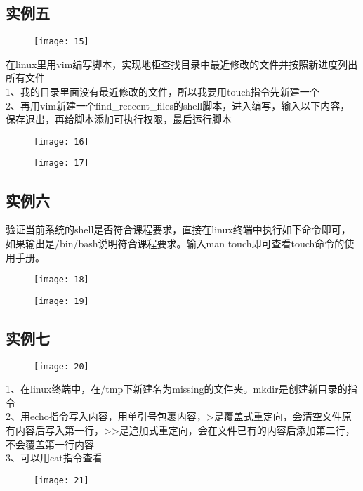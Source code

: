 \documentclass[12pt,letterpaper]{article}
\begin{document}
\subsection{实例五}
\begin{figure}[H]
\centering
\texttt{[image: 15]}
\end{figure}
在linux里用vim编写脚本，实现地柜查找目录中最近修改的文件并按照新进度列出所有文件\\
1、我的目录里面没有最近修改的文件，所以我要用touch指令先新建一个\\
2、再用vim新建一个find\_reccent\_files的shell脚本，进入编写，输入以下内容，保存退出，再给脚本添加可执行权限，最后运行脚本
\begin{figure}[H]
\centering
\texttt{[image: 16]}
\end{figure}
\vspace{-6mm}
\begin{figure}[H]
\centering
\texttt{[image: 17]}
\end{figure}

\subsection{实例六}
验证当前系统的shell是否符合课程要求，直接在linux终端中执行如下命令即可，如果输出是/bin/bash说明符合课程要求。输入man touch即可查看touch命令的使用手册。
\begin{figure}[H]
\centering
\texttt{[image: 18]}
\end{figure}
\vspace{-6mm}
\begin{figure}[H]
\centering
\texttt{[image: 19]}
\end{figure}

\subsection{实例七}
\begin{figure}[H]
\centering
\texttt{[image: 20]}
\end{figure}
1、在linux终端中，在/tmp下新建名为missing的文件夹。mkdir是创建新目录的指令\\
2、用echo指令写入内容，用单引号包裹内容，>是覆盖式重定向，会清空文件原有内容后写入第一行，>>是追加式重定向，会在文件已有的内容后添加第二行，不会覆盖第一行内容\\
3、可以用cat指令查看
\begin{figure}[H]
\centering
\texttt{[image: 21]}
\end{figure}
\end{document}
